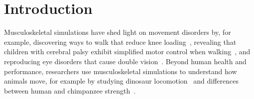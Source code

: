 \documentclass[10pt,letterpaper]{article}
\providecommand{\DIFaddtex}[1]{{\protect\color{blue}\uwave{#1}}} %
\providecommand{\DIFaddbegin}{} %
\providecommand{\DIFaddend}{} %
\providecommand{\DIFadd}[1]{\texorpdfstring{\DIFaddtex{#1}}{#1}} %
\newcommand{\DIFaddincludegraphics}[2][]{{\color{blue}\fbox{\DIFOincludegraphics[#1]{#2}}}} %
\DeclareRobustCommand{\DIFaddbegin}{\DIFOaddbegin \let\includegraphics\DIFaddincludegraphics} %
\DeclareRobustCommand{\DIFaddend}{\DIFOaddend \let\includegraphics\DIFOincludegraphics} %
\begin{document}
\section*{Introduction}

Musculoskeletal simulations have shed light on movement disorders by, for example, discovering ways to walk that reduce knee loading~\cite{Fregly:2007ac}, revealing that children with cerebral palsy exhibit simplified motor control when walking~\cite{Steele:2015}, and reproducing eye disorders that cause double vision~\cite{Priamikov:2016}. Beyond human health and performance, researchers use musculoskeletal simulations to understand how \DIFaddbegin \DIFadd{nonhuman }\DIFaddend animals move, for example by studying dinosaur locomotion~\cite{sthaya:2005uk} and differences between human and chimpanzee strength~\cite{ONeill:2017}.
\end{document}
